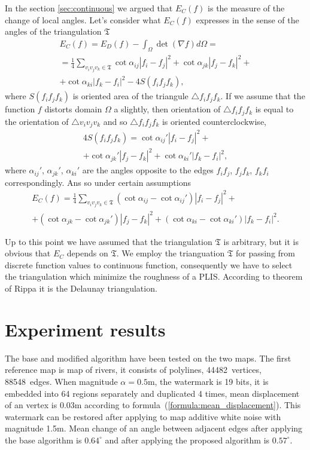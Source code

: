 \documentclass{article}
\begin{document}
In the section \ref{sec:continuous} we argued that $E_C(f)$ is the measure of the change of local angles. 
Let's consider what $E_C(f)$ expresses in the sense of the angles of the triangulation $\mathfrak{T}$ 
\begin{multline*}
  E_C(f) = E_D(f) - \int_{\Omega} \det (\nabla f) d\Omega = \\ 
  = \frac{1}{4} \sum_{v_i v_j v_k \in \mathfrak{T}} \cot{\alpha_{ij}}|f_i - f_j|^2 + \cot{\alpha_{jk}}|f_j - f_k|^2 + \\ 
  + \cot{\alpha_{ki}}|f_k - f_i|^2 - 4S(f_i f_j f_k),
\end{multline*}
where $S(f_i f_j f_k)$ is oriented area of the triangule $\triangle f_i f_j f_k$. If we assume that the function $f$ distorts domain $\Omega$ a slightly, 
then orientation of $\triangle f_i f_j f_k$ is equal to the orientation of $\triangle v_i v_j v_k$ and so $\triangle f_i f_j f_k$ is oriented counterclockwise,
\begin{multline*}
  4 S(f_i f_j f_k) = \cot{\alpha_{ij}'}|f_i - f_j|^2 + \\ + \cot{\alpha_{jk}'}|f_j - f_k|^2 + \cot{\alpha_{ki}'}|f_k - f_i|^2,
\end{multline*}
where $\alpha_{ij}'$, $\alpha_{jk}'$, $\alpha_{ki}'$ are the angles opposite to the edges $f_i f_j$, $f_j f_k$, $f_k f_i$ correspondingly. 
Ans so under certain assumptions
\begin{multline*}
  E_C(f) = \frac{1}{4} \sum_{v_i v_j v_k \in \mathfrak{T}} (\cot{\alpha_{ij}} - \cot{\alpha_{ij}'})|f_i - f_j|^2 + \\
  + (\cot{\alpha_{jk}} - \cot{\alpha_{jk}'})|f_j - f_k|^2 + (\cot{\alpha_{ki}} - \cot{\alpha_{ki}'})|f_k - f_i|^2.
\end{multline*}

Up to this point we have assumed that the triangulation $\mathfrak{T}$ is arbitrary, but it is obvious that $E_C$ depends on $\mathfrak{T}$. 
We employ the trianguation $\mathfrak{T}$ for passing from discrete function values to continuous function, consequently we have to select 
the triangulation which minimize the roughness of a PLIS. According to theorem of Rippa \cite{Rippa, Chen} it is the Delaunay triangulation.  

\section{Experiment results}
\label{sec:results}
The base and modified algorithm have been tested on the two maps. The first reference map is map of rivers, it consists of polylines, 44482~vertices, 88548~edges. When magnitude $\alpha = 0.5$m, 
the watermark is 19 bits, it is embedded into 64 regions separately and duplicated 4 times, mean displacement of an vertex is 0.03m according to formula~(\ref{formula:mean_displacement}). This watermark can be restored
after applying to map additive white noise with magnitude 1.5m. Mean change of an angle between adjacent edges after applying the base algorithm is $0.64^\circ$ and after applying the proposed algorithm is $0.57^\circ$.
\end{document}
